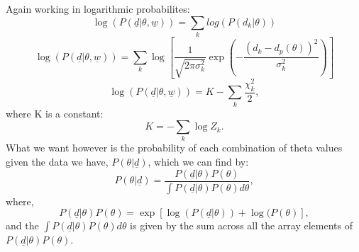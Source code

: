 \documentclass[a4paper, twoside, 12pt]{article}
\begin{document}
Again working in logarithmic probabilites:
\begin{equation*}
\log{(P(\underline{d}|\theta, \underline{w}))} = \sum_{k} log(P(d_{k}|\theta))
\end{equation*}
\begin{equation*}
\log{(P(\underline{d}|\theta, \underline{w}))}  = \sum_{k} \log{\left[\frac{1}{\sqrt{2\pi\sigma_{k}^2}} \exp{\left( -\frac{(d_{k} - d_{p}(\theta))^2}{\sigma_{k}^2} \right)}\right]}
\end{equation*}
\begin{equation*}
\log{(P(\underline{d}|\theta, \underline{w}))}  = K - \sum_{k} \frac{\chi_{k}^2}{2},
\end{equation*}
where K is a constant:
\begin{equation*}
K = - \sum_{k} \log{Z_{k}}. 
\end{equation*}
What we want however is the probability of each combination of theta values given the data we have, $P(\theta|\underline{d})$, which we can find by:
\begin{equation*}
P(\theta|\underline{d}) = \frac{P(\underline{d}|\theta)P(\theta)}{\int P(\underline{d}|\theta)P(\theta) d\theta},
\end{equation*}
where,
\begin{equation*}
P(\underline{d}|\theta)P(\theta) = \exp{\left[\log{(P(\underline{d}|\theta))} + \log{(P(\theta)}\right]},
\end{equation*}
and the $\int P(\underline{d}|\theta)P(\theta) d\theta$ is given by the sum across all the array elements of $P(\underline{d}|\theta)P(\theta)$.
\end{document}

